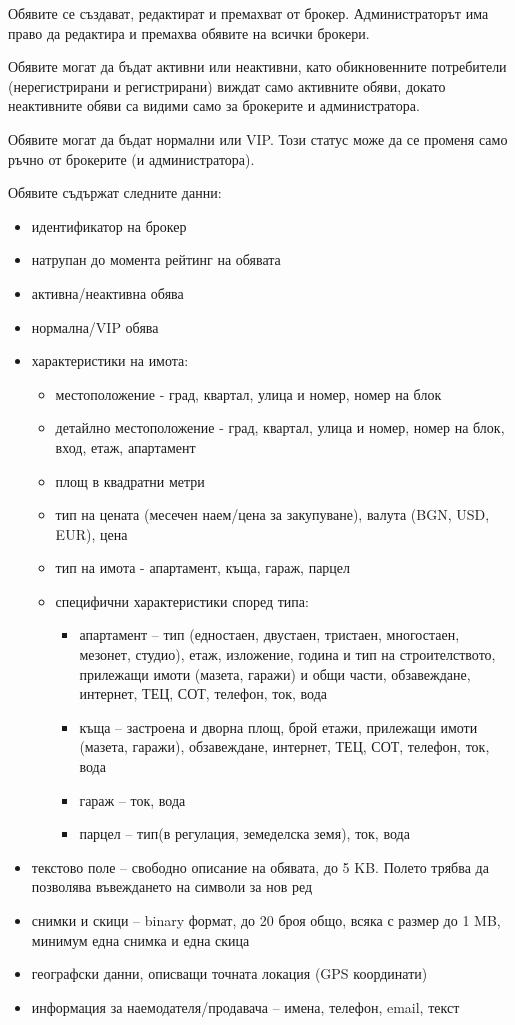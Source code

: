 \documentclass[]{article}
\begin{document}
\begin{enumerate}[I.]
{\begin{enumerate}[1.]
{				Обявите се създават, редактират и премахват от брокер. Администраторът има право да редактира и премахва обявите на всички брокери.

				Обявите могат да бъдат активни или неактивни, като обикновенните потребители (нерегистрирани и регистрирани) виждат само активните обяви, докато неактивните обяви са видими само за брокерите и администратора.

				Обявите могат да бъдат нормални или VIP. Този статус може да се променя само ръчно от брокерите (и администратора).
				
				Обявите съдържат следните данни:
				\begin{itemize}
					\item идентификатор на брокер
					\item натрупан до момента рейтинг на обявата
					\item активна/неактивна обява 
					\item нормална/VIP обява
					\item {характеристики на имота:
						\begin{itemize}
							\item местоположение - град, квартал, улица и номер, номер на блок
							\item детайлно местоположение - град, квартал, улица и номер, номер на блок, вход, етаж, апартамент
							\item площ в квадратни метри
							\item тип на цената (месечен наем/цена за закупуване), валута (BGN, USD, EUR), цена
							\item тип на имота - апартамент, къща, гараж, парцел
							\item {специфични характеристики според типа:
								\begin{itemize}
									\item апартамент -- тип (едностаен, двустаен, тристаен, многостаен, мезонет, студио), етаж, изложение, година и тип на строителството, прилежащи имоти (мазета, гаражи) и общи части, обзавеждане, интернет, ТЕЦ, СОТ, телефон, ток, вода
									\item къща -- застроена и дворна площ, брой етажи, прилежащи имоти (мазета, гаражи),	обзавеждане, интернет, ТЕЦ, СОТ, телефон, ток, вода
									\item гараж -- ток, вода
									\item парцел -- тип(в регулация, земеделска земя), ток, вода
								\end{itemize}
							}
						\end{itemize}
					}
					\item текстово поле -- свободно описание на обявата, до 5 KB. Полето трябва да позволява въвеждането на символи за нов ред
					\item снимки и скици -- binary формат, до 20 броя общо, всяка с размер до 1 MB, минимум една снимка и една скица 
					\item географски данни, описващи точната локация (GPS координати)
					\item информация за наемодателя/продавача -- имена, телефон, email, текст
				\end{itemize}
				
}
\end{enumerate}}
\end{enumerate}
\end{document}
